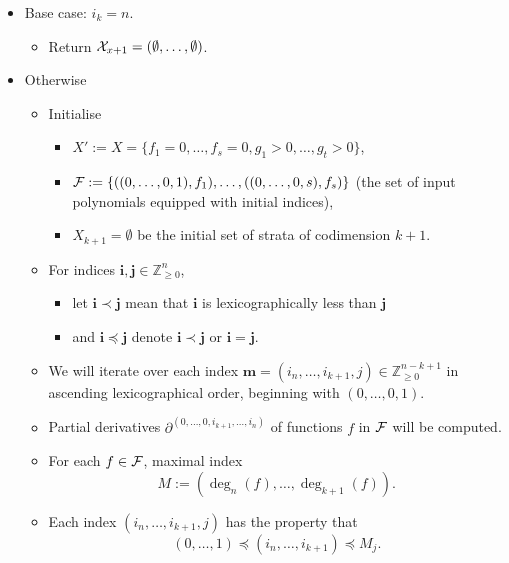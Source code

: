 \documentclass[
]{book}
\providecommand{\tightlist}{%
  \setlength{\itemsep}{0pt}\setlength{\parskip}{0pt}}
\theoremstyle{definition}
\theoremstyle{definition}
\theoremstyle{definition}
\theoremstyle{definition}
\theoremstyle{remark}
\begin{document}
\begin{itemize}
\item
  Base case: \(i_k = n\).

  \begin{itemize}
  \tightlist
  \item
    Return \({\cal X}_{x+1} = (\emptyset, \ldots, \emptyset)\).
  \end{itemize}
\item
  Otherwise

  \begin{itemize}
  \item
    Initialise

    \begin{itemize}
    \item
      \(X' := X = \{ f_1 = 0,\ldots,f_s = 0, g_1 > 0, \ldots, g_t > 0 \}\),
    \item
      \({\cal F} := \{ ((0,\ldots,0,1), f_1), \ldots, ((0,\ldots,0,s), f_s) \}\)
      (the set of input polynomials equipped with initial indices),
    \item
      \(X_{k+1} = \emptyset\) be the initial set of strata of codimension \(k+1\).
    \end{itemize}
  \item
    For indices \(\mathbf{i},\mathbf{j} \in \mathbb{Z}_{\ge 0}^n\),

    \begin{itemize}
    \tightlist
    \item
      let \(\mathbf{i} \prec \mathbf{j}\) mean that \(\mathbf{i}\) is lexicographically less than \(\mathbf{j}\)
    \item
      and \(\mathbf{i} \preceq \mathbf{j}\) denote \(\mathbf{i}\prec \mathbf{j}\) or \(\mathbf{i} = \mathbf{j}\).
    \end{itemize}
  \item
    We will iterate over each index \(\mathbf{m} = (i_n,\ldots,i_{k+1},j) \in \mathbb{Z}_{\ge 0}^{n-k+1}\) in ascending lexicographical order, beginning with \((0,\ldots,0,1)\).
  \item
    Partial derivatives \(\partial^{(0,\ldots,0,i_{k+1},\ldots,i_n)}\) of functions \(f\) in \({\cal F}\) will be computed.
  \item
    For each \(f\in {\cal F}\), maximal index \[M := (\deg_n(f), \ldots, \deg_{k+1}(f)).\]
  \item
    Each index \((i_n,\ldots,i_{k+1},j)\) has the property that
    \[
    (0,\ldots,1) \preceq (i_n,\ldots,i_{k+1}) \preceq M_j.
    \]


\end{itemize}
\end{itemize}
\end{document}
